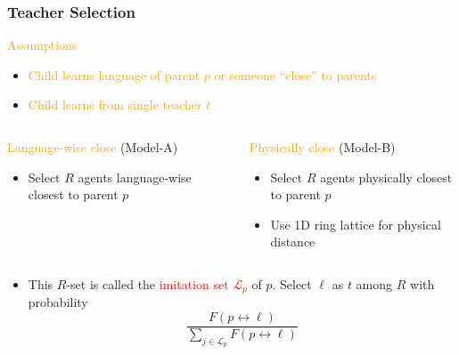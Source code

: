 \documentclass{beamer}
\newcommand{\hbDefined}[1]{\textcolor{red}{{#1}}}
\newcommand{\hbEmph}[1]{\textcolor{orange}{#1}}
\theoremstyle{plain}
\theoremstyle{definition}
\theoremstyle{remark}
\begin{document}
\begin{frame}\frametitle{Teacher Selection}
	\hbEmph{Assumptions}
\begin{itemize}

	\item 
	\hbEmph{Child learns language of parent $p$ or someone ``close'' to parents}
	
	\item
	\hbEmph{Child learns from single teacher $t$}

\end{itemize}

	\begin{columns}[T]
	\begin{column}{.5\linewidth}   
	    	\hbEmph{Language-wise close} (Model-A)
		\begin{itemize}
			\item
			Select $R$ agents language-wise closest to parent $p$
		\end{itemize}
	\end{column}
	\begin{column}{.5\linewidth}
	    	\hbEmph{Physically close} (Model-B)
		\begin{itemize}
			\item
			Select $R$ agents physically closest to parent $p$
			
			\item
			Use 1D ring lattice for physical distance
			
		\end{itemize}
	\end{column}
	\end{columns}

\begin{itemize}
	\item
	This $R$-set is called the \hbDefined{imitation set} 
	\hbDefined{$\mathcal{L}_{p}$} of $p$.
	Select $\ell$ as $t$ among $R$ with probability
	\[
		\frac
			{F(p \leftrightarrow \ell)}
			{\sum_{j \in \mathcal{L}_{p}} F(p \leftrightarrow \ell)}
	\]
\end{itemize}

\end{frame}
\end{document}
